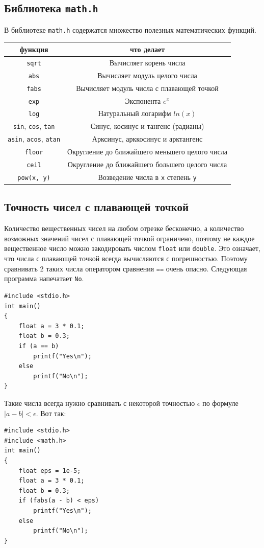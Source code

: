 \documentclass{article}
\begin{document}
\subsection*{Библиотека \texttt{math.h}}
В библиотеке \texttt{math.h} содержатся множество полезных математических функций.

\begin{center}
\begin{tabular}{ c c }
 функция & что делает \\ \hline
 \texttt{sqrt}     & Вычисляет корень числа \\ 
 \texttt{abs}      & Вычисляет модуль целого числа \\ 
 \texttt{fabs}     & Вычисляет модуль числа с плавающей точкой \\ 
 \texttt{exp}      & Экспонента $e^x$ \\ 
 \texttt{log}      & Натуральный логарифм $ln(x)$ \\
 \texttt{sin}, \texttt{cos},  \texttt{tan} & Синус, косинус и тангенс (радианы) \\ 
 \texttt{asin}, \texttt{acos},  \texttt{atan} & Арксинус, арккосинус и арктангенс \\ 
 \texttt{floor}      & Округление до ближайшего меньшего целого числа \\
 \texttt{ceil}       & Округление до ближайшего большего целого числа \\
 \texttt{pow(x, y)}        & Возведение числа в \texttt{x} степень \texttt{y} \\
\end{tabular}
\end{center}


\subsection*{Точность чисел с плавающей точкой}
Количество вещественных чисел на любом отрезке бесконечно, а количество возможных значений чисел с плавающей точкой ограничено, поэтому не каждое вещественное число можно закодировать числом \texttt{float} или \texttt{double}. Это означает, что числа с плавающей точкой всегда вычисляются с погрешностью. Поэтому сравнивать 2 таких числа оператором сравнения \texttt{==} очень опасно. Следующая программа напечатает \texttt{No}.
\begin{lstlisting}
#include <stdio.h>
int main() 
{
    float a = 3 * 0.1;
    float b = 0.3;
    if (a == b)
        printf("Yes\n");
    else
        printf("No\n");
}
\end{lstlisting}
Такие числа всегда нужно сравнивать с некоторой точностью $\epsilon$ по формуле $|a - b| < \epsilon$. Вот так:\\ 
\begin{lstlisting}
#include <stdio.h>
#include <math.h>
int main() 
{
    float eps = 1e-5;
    float a = 3 * 0.1;
    float b = 0.3;
    if (fabs(a - b) < eps)
        printf("Yes\n");
    else
        printf("No\n");
}
\end{lstlisting}
\end{document}
